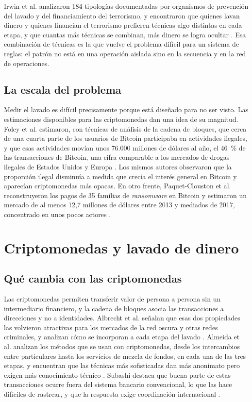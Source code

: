 Irwin et al. analizaron 184 tipologías documentadas por organismos de prevención del lavado y
del financiamiento del terrorismo, y encontraron que quienes lavan dinero y quienes financian
el terrorismo prefieren técnicas algo distintas en cada etapa, y que cuantas más técnicas se
combinan, más dinero se logra ocultar \cite{Irwin2012Typologies}. Esa combinación de técnicas
es la que vuelve el problema difícil para un sistema de reglas: el patrón no está en una
operación aislada sino en la secuencia y en la red de operaciones.

\subsection{La escala del problema}

Medir el lavado es difícil precisamente porque está diseñado para no ser visto. Las
estimaciones disponibles para las criptomonedas dan una idea de su magnitud. Foley et al.
estimaron, con técnicas de análisis de la cadena de bloques, que cerca de una cuarta parte de
los usuarios de Bitcoin participaba en actividades ilegales, y que esas actividades movían unos
76.000 millones de dólares al año, el 46~\% de las transacciones de Bitcoin, una cifra comparable
a los mercados de drogas ilegales de Estados Unidos y Europa \cite{Foley2019Bitcoin}. Los
mismos autores observaron que la proporción ilegal disminuía a medida que crecía el interés
general en Bitcoin y aparecían criptomonedas más opacas. En otro frente, Paquet-Clouston et al.
reconstruyeron los pagos de 35 familias de \textit{ransomware} en Bitcoin y estimaron un mercado
de al menos 12,7 millones de dólares entre 2013 y mediados de 2017, concentrado en unos pocos
actores \cite{PaquetClouston2019Ransomware}.

\section{Criptomonedas y lavado de dinero}\label{sec:ctx_cripto}

\subsection{Qué cambia con las criptomonedas}

Las criptomonedas permiten transferir valor de persona a persona sin un intermediario
financiero, y la cadena de bloques asocia las transacciones a direcciones y no a identidades.
Albrecht et al. señalan que esas dos propiedades las volvieron atractivas para los mercados de
la red oscura y otras redes criminales, y analizan cómo se incorporan a cada etapa del lavado
\cite{Albrecht2019Crypto}. Almeida et al. analizan los métodos que se usan con criptomonedas, desde los intercambios entre particulares hasta los servicios de mezcla de fondos, en cada una de las tres etapas, y encuentran que las técnicas más sofisticadas dan más anonimato pero exigen más conocimiento técnico \cite{Almeida2025Techniques}. Subashi destaca que buena parte de estas transacciones ocurre fuera del sistema bancario convencional, lo que las hace difíciles de rastrear, y que la respuesta exige coordinación internacional \cite{Subashi2024Crypto}.

